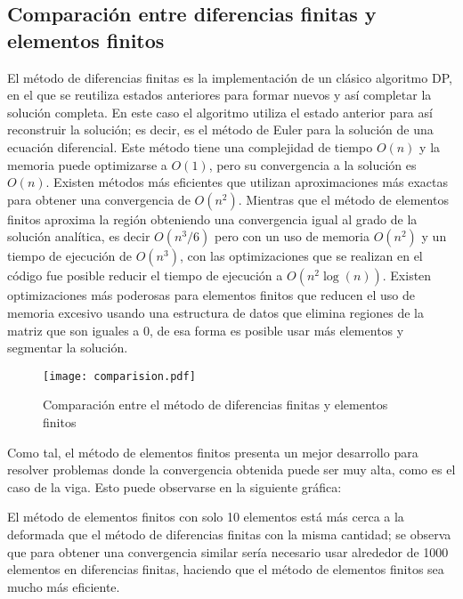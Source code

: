 \documentclass[12pt,a4paper]{article}
\begin{document}
\subsection*{Comparación entre diferencias finitas y elementos finitos}
El método de diferencias finitas es la implementación de un clásico algoritmo DP, en el que se reutiliza estados anteriores para formar nuevos y así completar la solución completa. En este caso el algoritmo utiliza el estado anterior para así reconstruir la solución; es decir, es el método de Euler para la solución de una ecuación diferencial. Este método tiene una complejidad de tiempo $O(n)$ y la memoria puede optimizarse a $O(1)$, pero su convergencia a la solución es $O(n)$. Existen métodos más eficientes que utilizan aproximaciones más exactas para obtener una convergencia de $O(n^{2})$. Mientras que el método de elementos finitos aproxima la región obteniendo una convergencia igual al grado de la solución analítica, es decir $O(n^{3}/6)$ pero con un uso de memoria $O(n^{2})$ y un tiempo de ejecución de $O(n^{3})$, con las optimizaciones que se realizan en el código fue posible reducir el tiempo de ejecución a $O(n^{2}\log(n))$. Existen optimizaciones más poderosas para elementos finitos que reducen el uso de memoria excesivo usando una estructura de datos que elimina regiones de la matriz que son iguales a 0, de esa forma es posible usar más elementos y segmentar la solución.
\begin{figure}[H]
    \centering
    \texttt{[image: comparision.pdf]}
    \caption{Comparación entre el método de diferencias finitas y elementos finitos}
\end{figure}
Como tal, el método de elementos finitos presenta un mejor desarrollo para resolver problemas donde la convergencia obtenida puede ser muy alta, como es el caso de la viga. Esto puede observarse en la siguiente gráfica:

El método de elementos finitos con solo 10 elementos está más cerca a la deformada que el método de diferencias finitas con la misma cantidad; se observa que para obtener una convergencia similar sería necesario usar alrededor de 1000 elementos en diferencias finitas, haciendo que el método de elementos finitos sea mucho más eficiente.
\end{document}

